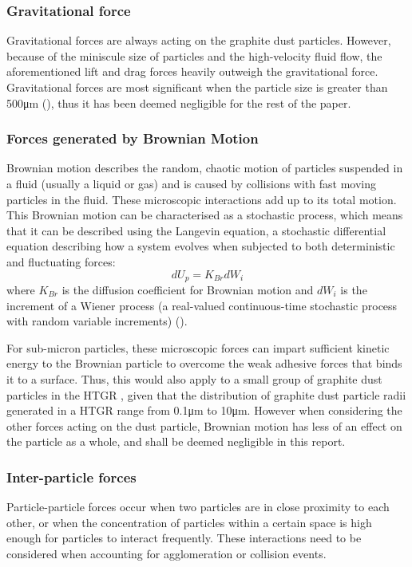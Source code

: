 \documentclass{article}
\begin{document}
\subsubsection{Gravitational force}
Gravitational forces are always acting on the graphite dust particles. However, because of the miniscule size of particles and the high-velocity fluid flow, the aforementioned lift and drag forces heavily outweigh the gravitational force. Gravitational forces are most significant when the particle size is greater than 500μm (\cite{ISAIFAN2019413}), thus it has been deemed negligible for the rest of the paper.

\subsubsection{Forces generated by Brownian Motion}

Brownian motion describes the random, chaotic motion of particles suspended in a fluid (usually a liquid or gas) and is caused by collisions with fast moving particles in the fluid. These microscopic interactions add up to its total motion. This Brownian motion can be characterised as a stochastic process, which means that it can be described using the Langevin equation, a stochastic differential equation describing how a system evolves when subjected to both deterministic and fluctuating forces: 
\begin{equation} \label{10}
    dU_p = K_{Br} dW_i
\end{equation}
where \(K_{Br}\) is the diffusion coefficient for Brownian motion and \(dW_i\) is the increment of a Wiener process (a real-valued continuous-time stochastic process with random variable increments) (\cite{henry2018}).

For sub-micron particles, these microscopic forces can impart sufficient kinetic energy to the Brownian particle to overcome the weak adhesive forces that binds it to a surface. Thus, this would also apply to a small group of graphite dust particles in the HTGR , given that the distribution of graphite dust particle radii generated in a HTGR  range from 0.1μm to 10μm. However when considering the other forces acting on the dust particle, Brownian motion has less of an effect on the particle as a whole, and shall be deemed negligible in this report. 

\subsubsection{Inter-particle forces}
Particle-particle forces occur when two particles are in close proximity to each other, or when the concentration of particles within a certain space is high enough for particles to interact frequently. These interactions need to be considered when accounting for agglomeration or collision events. 
\end{document}
